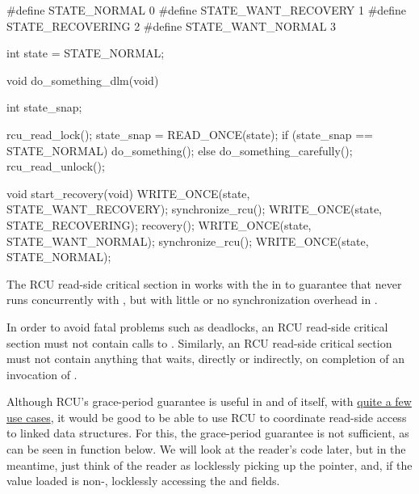 \begin{fcvlabel}
\begin{VerbatimN}[commandchars=\%\@\$]
	#define STATE_NORMAL        0
	#define STATE_WANT_RECOVERY 1
	#define STATE_RECOVERING    2
	#define STATE_WANT_NORMAL   3

	int state = STATE_NORMAL;

	void do_something_dlm(void)
	{
		int state_snap;

		rcu_read_lock();
		state_snap = READ_ONCE(state);
		if (state_snap == STATE_NORMAL)
			do_something();
		else
			do_something_carefully();
		rcu_read_unlock();
	}

	void start_recovery(void)
	{
		WRITE_ONCE(state, STATE_WANT_RECOVERY);
		synchronize_rcu();
		WRITE_ONCE(state, STATE_RECOVERING);
		recovery();
		WRITE_ONCE(state, STATE_WANT_NORMAL);
		synchronize_rcu();   %
		WRITE_ONCE(state, STATE_NORMAL);
	}
\end{VerbatimN}
\end{fcvlabel}

The RCU read-side critical section in  works with
the  in  to guarantee that
 never runs concurrently with , but with
little or no synchronization overhead in .

\QuickQuizEnd

In order to avoid fatal problems such as deadlocks, an RCU read-side
critical section must not contain calls to .
Similarly, an RCU read-side critical section must not contain anything
that waits, directly or indirectly, on completion of an invocation of
.

Although RCU's grace-period guarantee is useful in and of itself, with
\href{https://lwn.net/Articles/573497/}{quite a few use cases}, it would
be good to be able to use RCU to coordinate read-side access to linked
data structures.
For this, the grace-period guarantee is not sufficient,
as can be seen in function  below.
We will look at the
reader's code later, but in the meantime, just think of the reader as
locklessly picking up the  pointer, and, if the value loaded is
non-, locklessly accessing the  and  fields.

